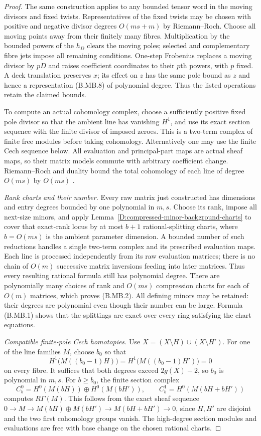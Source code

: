 \begin{proof}
The same construction applies to any bounded tensor word in
the moving divisors and fixed twists. Representatives of the
fixed twists may be chosen with positive and negative divisor
degrees $O(ms+m)$ by Riemann--Roch. Choose all moving points
away from their finitely many fibres. Multiplication by the
bounded powers of the $h_D$ clears the moving poles; selected
and complementary fibre jets impose all remaining conditions.
One-step Frobenius replaces a moving divisor by $pD$ and raises
coefficient coordinates to their $p$th powers, with $p$ fixed.
A deck translation preserves $x$; its effect on $z$ has the
same pole bound as $z$ and hence a representation (B.MB.8)
of polynomial degree. Thus the listed operations retain the
claimed bounds.

To compute an actual cohomology complex, choose a sufficiently
positive fixed pole divisor so that the ambient line has
vanishing $H^1$, and use its exact section sequence with the
finite divisor of imposed zeroes. This is a two-term complex
of finite free modules before taking cohomology. Alternatively
one may use the finite Cech sequence below. All evaluation
and principal-part maps are actual sheaf maps, so their
matrix models commute with arbitrary coefficient change.
Riemann--Roch and duality bound the total cohomology of each
line of degree $O(ms)$ by $O(ms)$
\citep[Tags 0BS2 and 0BS6]{StacksBNegativeCurve}.

\emph{Rank charts and their number.}
Every raw matrix just constructed has dimensions and entry
degrees bounded by one polynomial in $m,s$. Choose its rank,
impose all next-size minors, and apply
Lemma~\ref{D:compressed-minor-background-charts} to cover
that exact-rank locus by at most $b+1$ rational-splitting
charts, where $b=O(ms)$ is the ambient parameter dimension.
A bounded number of such reductions handles a single
two-term complex and its prescribed evaluation maps.
Each line is processed independently from its raw evaluation
matrices; there is no chain of $O(m)$ successive matrix
inversions feeding into later matrices.
Thus every resulting rational formula still has polynomial
degree. There are polynomially many choices of rank and
$O(ms)$ compression charts for each of $O(m)$ matrices,
which proves (B.MB.2). All defining minors may be retained:
their degrees are polynomial even though their number can
be large. Formula (B.MB.1) shows that the splittings are exact
over every ring satisfying the chart equations.

\emph{Compatible finite-pole Cech homotopies.}
Use $X=(X\setminus H)\cup(X\setminus H')$. For one of the
line families $M$, choose $b_0$ so that
\[
 H^1\bigl(M((b_0-1)H)\bigr)
   =H^1\bigl(M((b_0-1)H')\bigr)=0                       \tag{B.MB.9}
\]
on every fibre. It suffices that both degrees exceed
$2g(X)-2$, so $b_0$ is polynomial in $m,s$.
For $b\geq b_0$, the finite section complex
\[
 C_b^0=H^0(M(bH))\oplus H^0(M(bH')),
       \qquad C_b^1=H^0(M(bH+bH'))                       \tag{B.MB.10}
\]
computes $R\Gamma(M)$. This follows from the exact sheaf
sequence
$0\to M\to M(bH)\oplus M(bH')\to M(bH+bH')\to0$,
since $H,H'$ are disjoint and the two first cohomology groups
vanish. The high-degree section modules and evaluations
are free with base change on the chosen rational charts.


\end{proof}
